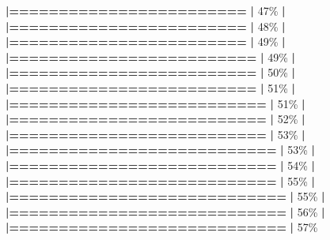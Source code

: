 \documentclass[
]{book}
\newenvironment{Shaded}{\begin{snugshade}}{\end{snugshade}}
\newcommand{\DecValTok}[1]{\textcolor[rgb]{0.00,0.00,0.81}{#1}}
\newcommand{\ErrorTok}[1]{\textcolor[rgb]{0.64,0.00,0.00}{\textbf{#1}}}
\newcommand{\NormalTok}[1]{#1}
\newcommand{\SpecialCharTok}[1]{\textcolor[rgb]{0.81,0.36,0.00}{\textbf{#1}}}
\begin{document}
\begin{Shaded}
\begin{Highlighting}[]
  \ErrorTok{|========================}                          \ErrorTok{|}  \DecValTok{47}\NormalTok{\%}
  \SpecialCharTok{|}                                                        
  \ErrorTok{|========================}                          \ErrorTok{|}  \DecValTok{48}\NormalTok{\%}
  \SpecialCharTok{|}                                                        
  \ErrorTok{|========================}                          \ErrorTok{|}  \DecValTok{49}\NormalTok{\%}
  \SpecialCharTok{|}                                                        
  \ErrorTok{|=========================}                         \ErrorTok{|}  \DecValTok{49}\NormalTok{\%}
  \SpecialCharTok{|}                                                        
  \ErrorTok{|=========================}                         \ErrorTok{|}  \DecValTok{50}\NormalTok{\%}
  \SpecialCharTok{|}                                                        
  \ErrorTok{|=========================}                         \ErrorTok{|}  \DecValTok{51}\NormalTok{\%}
  \SpecialCharTok{|}                                                        
  \ErrorTok{|==========================}                        \ErrorTok{|}  \DecValTok{51}\NormalTok{\%}
  \SpecialCharTok{|}                                                        
  \ErrorTok{|==========================}                        \ErrorTok{|}  \DecValTok{52}\NormalTok{\%}
  \SpecialCharTok{|}                                                        
  \ErrorTok{|==========================}                        \ErrorTok{|}  \DecValTok{53}\NormalTok{\%}
  \SpecialCharTok{|}                                                        
  \ErrorTok{|===========================}                       \ErrorTok{|}  \DecValTok{53}\NormalTok{\%}
  \SpecialCharTok{|}                                                        
  \ErrorTok{|===========================}                       \ErrorTok{|}  \DecValTok{54}\NormalTok{\%}
  \SpecialCharTok{|}                                                        
  \ErrorTok{|===========================}                       \ErrorTok{|}  \DecValTok{55}\NormalTok{\%}
  \SpecialCharTok{|}                                                        
  \ErrorTok{|============================}                      \ErrorTok{|}  \DecValTok{55}\NormalTok{\%}
  \SpecialCharTok{|}                                                        
  \ErrorTok{|============================}                      \ErrorTok{|}  \DecValTok{56}\NormalTok{\%}
  \SpecialCharTok{|}                                                        
  \ErrorTok{|============================}                      \ErrorTok{|}  \DecValTok{57}\NormalTok{\%}

\end{Highlighting}
\end{Shaded}
\end{document}
